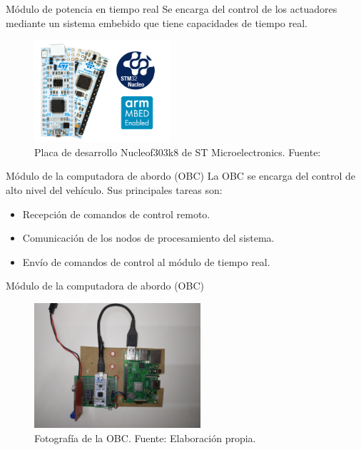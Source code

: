 \documentclass[10pt]{beamer}
\begin{document}
\begin{frame}{Módulo de potencia en tiempo real}
    Se encarga del control de los actuadores mediante un sistema embebido 
    que tiene capacidades de tiempo real.

    \begin{figure}[!h] 
        \centering
        \includegraphics[width=0.45\textwidth]{../img/nucleo}
        \caption[Placa de desarrollo Nucleof303k8 de ST Microelectronics]{Placa de desarrollo Nucleof303k8 de ST Microelectronics. Fuente: \cite{nucleof303} }
        \end{figure}
\end{frame}


\begin{frame}{Módulo de la computadora de abordo (OBC)}
    La OBC se encarga del control de alto nivel del vehículo. Sus principales tareas son:
    \begin{itemize}
        \item Recepción de comandos de control remoto.
        \item Comunicación de los nodos de procesamiento del sistema.
        \item Envío de comandos de control al módulo de tiempo real.
    \end{itemize}
\end{frame}

\begin{frame}{Módulo de la computadora de abordo (OBC)}
    \begin{figure}[!h] 
        \centering
        \includegraphics[width=0.55\textwidth]{../img/obc}
        \caption[Fotografía de la OBC]{Fotografía de la OBC. Fuente: Elaboración propia. }
    \end{figure}
\end{frame}
\end{document}
